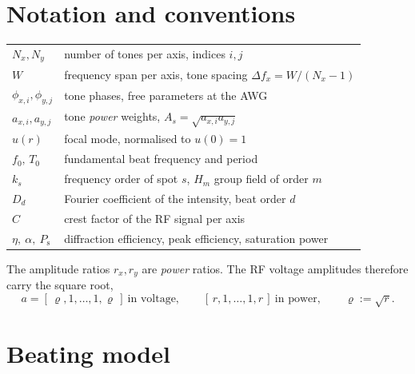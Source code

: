 
\section{Notation and conventions}
\label{app:notation}

\begin{center}
\begin{tabular}{ll}
\hline
$N_x,N_y$ & number of tones per axis, indices $i,j$\\
$W$ & frequency span per axis, tone spacing $\Delta f_{x}=W/(N_x-1)$\\
$\phi_{x,i},\phi_{y,j}$ & tone phases, free parameters at the AWG\\
$a_{x,i},a_{y,j}$ & tone \emph{power} weights, $A_s=\sqrt{a_{x,i}a_{y,j}}$\\
$u(r)$ & focal mode, normalised to $u(0)=1$\\
$f_0,\,T_0$ & fundamental beat frequency and period\\
$k_s$ & frequency order of spot $s$, $H_m$ group field of order $m$\\
$D_d$ & Fourier coefficient of the intensity, beat order $d$\\
$C$ & crest factor of the RF signal per axis\\
$\eta,\ \alpha,\ P_\mathrm{s}$ & diffraction efficiency, peak efficiency, saturation power\\
\hline
\end{tabular}
\end{center}

The amplitude ratios $r_x,r_y$ are \emph{power} ratios. The RF voltage
amplitudes therefore carry the square root,
\begin{equation}
a=[\,\varrho,1,\dots,1,\varrho\,]\ \text{in voltage},
\qquad
[\,r,1,\dots,1,r\,]\ \text{in power},
\qquad
\varrho:=\sqrt{r} .
\label{eq:app_conv}
\end{equation}

\section{Beating model}
\label{app:beating}


